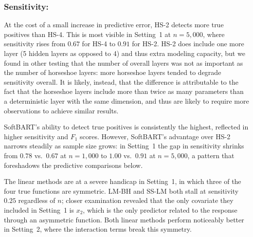 {\subsubsection*{Sensitivity:}
At the cost of a small increase in predictive error, HS-2 detects more true positives than HS-4.  This is most visible in Setting~1 at $n=5,000$, where sensitivity rises from $0.67$ for HS-4 to $0.91$ for HS-2.  HS-2 does include one more layer (5 hidden layers as opposed to 4) and thus extra modeling capacity, but we found in other testing that the number of overall layers was not as important as the number of horseshoe layers: more horseshoe layers tended to degrade sensitivity overall.  It is likely, instead, that the difference is attributable to the fact that the horseshoe layers include more than twice as many parameters than a deterministic layer with the same dimension, and thus are likely to require more observations to achieve similar results.

SoftBART's ability to detect true positives is consistently the highest, 
reflected in higher sensitivity and $F_1$ scores.  However, SoftBART's advantage over HS-2
narrows steadily as sample size grows: in Setting~1 the
gap in sensitivity shrinks from $0.78$ vs.\ $0.67$ at $n=1{,}000$ to $1.00$ vs.\
$0.91$ at $n=5{,}000$, a pattern that foreshadows the predictive
comparisons below. 

The linear methods are at a severe handicap in Setting~1, in which three of the four true functions are symmetric.  
LM-BH and SS-LM both stall at sensitivity $0.25$ regardless of $n$; closer examination revealed that the only covariate 
they included in Setting~1 is $x_2$, which is the only predictor related to the response through an asymmetric function.  Both linear methods perform noticeably better in Setting~2, where the interaction terms break this symmetry.

}
